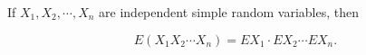 If $X_1, X_2, \cdots, X_n$ are independent simple random variables, then

$$E(X_1 X_2 \cdots X_n) = EX_1 \cdot EX_2 \cdots EX_n.$$
